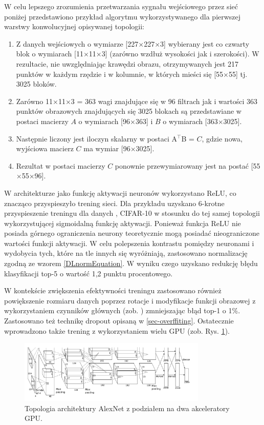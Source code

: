 W celu lepszego zrozumienia przetwarzania sygnału wejściowego przez sieć poniżej przedstawiono przykład algorytmu wykorzystywanego dla pierwszej warstwy konwolucyjnej opisywanej topologii: 
\begin{enumerate}
\item Z danych wejściowych o wymiarze [227$\times$227$\times$3] wybierany jest co czwarty blok  o wymiarach [11$\times$11$\times$3] (zarówno wzdłuż wysokości jak i szerokości). W rezultacie, nie uwzględniając krawędzi obrazu, otrzymywanych jest 217 punktów w każdym rzędzie i w kolumnie, w których mieści się [55$\times$55] tj. 3025 bloków.
\item Zarówno 11$\times$11$\times$3 = 363 wagi znajdujące się w 96 filtrach jak i wartości 363 punktów obrazowych znajdujących się 3025 blokach są przedstawiane w postaci macierzy $A$ o wymiarach [96$\times$363] i $B$ o wymiarach [363$\times$3025].
\item Następnie liczony jest iloczyn skalarny w postaci A$^\intercal$B = $C$, gdzie nowa, wyjściowa macierz $C$ ma wymiar [96$\times$3025].
\item Rezultat w postaci macierzy $C$ ponownie przewymiarowany jest na postać [55$\times$55$\times$96].  
\end{enumerate} 

W architekturze jako funkcję aktywacji neuronów wykorzystano ReLU, co znacząco przyspieszyło trening sieci. Dla przykładu uzyskano 6-krotne przyspieszenie treningu dla danych \cite{CIFAR}, CIFAR-10 w stosunku do tej samej topologii wykorzystującej sigmoidalną funkcję aktywacji. Ponieważ funkcja ReLU nie posiada górnego ograniczenia neurony teoretycznie mogą posiadać nieograniczone wartości funkcji aktywacji. W celu polepszenia kontrastu pomiędzy neuronami i wydobycia tych, które na tle innych się wyróżniają, zastosowano normalizację zgodną ze wzorem \ref{DLnormEquation}. W wyniku czego uzyskano redukcję błędu klasyfikacji top-5 o wartość 1,2 punktu procentowego.

W kontekście zwiększenia efektywności treningu zastosowano również powiększenie rozmiaru danych poprzez rotacje i modyfikacje funkcji obrazowej z wykorzystaniem czynników głównych (zob. \cite{Krizhevsky2012}) zmniejszając błąd top-1 o 1\%. Zastosowano też technikę dropout opisaną w \ref{sec-overffiting}. Ostatecznie wprowadzono także trening z wykorzystaniem wielu GPU (zob. Rys. \ref{AlexNetTopologyMultiGPU}). 

\begin{figure}[h!]
	\centering
	\includegraphics[width=0.8\textwidth]{figures/AlexNet-multiGPU.png}
	\caption{Topologia architektury AlexNet z podziałem na dwa akceleratory GPU.}
	\label{AlexNetTopologyMultiGPU}
\end{figure}

